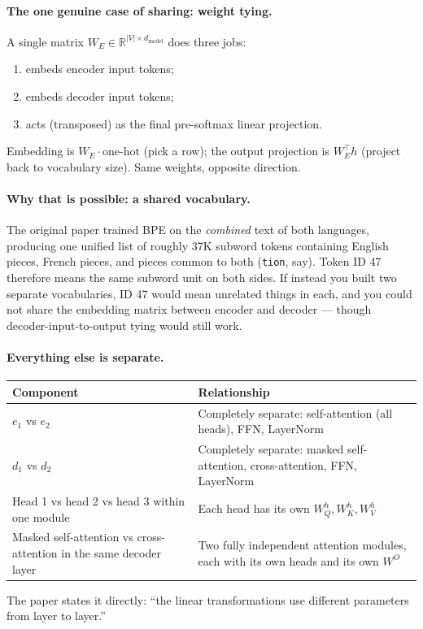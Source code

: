 \documentclass[11pt,a4paper]{article}
\begin{document}
\paragraph{The one genuine case of sharing: weight tying.} A single matrix
$W_E \in \mathbb{R}^{|V| \times d_{\text{model}}}$ does three jobs:
\begin{enumerate}
\item embeds encoder input tokens;
\item embeds decoder input tokens;
\item acts (transposed) as the final pre-softmax linear projection.
\end{enumerate}
Embedding is $W_E \cdot \text{one-hot}$ (pick a row); the output projection is
$W_E^\top h$ (project back to vocabulary size). Same weights, opposite direction.

\paragraph{Why that is possible: a shared vocabulary.} The original paper trained BPE on the
\emph{combined} text of both languages, producing one unified list of roughly 37K subword
tokens containing English pieces, French pieces, and pieces common to both (\texttt{tion},
say). Token ID 47 therefore means the same subword unit on both sides. If instead you built
two separate vocabularies, ID 47 would mean unrelated things in each, and you could not share
the embedding matrix between encoder and decoder --- though decoder-input-to-output tying
would still work.

\paragraph{Everything else is separate.}
\begin{center}
\begin{tabularx}{\textwidth}{lY}
\textbf{Component} & \textbf{Relationship} \\
\hline
$e_1$ vs $e_2$ & Completely separate: self-attention (all heads), FFN, LayerNorm \\
$d_1$ vs $d_2$ & Completely separate: masked self-attention, cross-attention, FFN, LayerNorm \\
Head 1 vs head 2 vs head 3 within one module & Each head has its own $W_Q^h, W_K^h, W_V^h$ \\
Masked self-attention vs cross-attention in the same decoder layer & Two fully independent
attention modules, each with its own heads and its own $W^O$ \\
\end{tabularx}
\end{center}
The paper states it directly: ``the linear transformations use different parameters from layer
to layer.''
\end{document}
